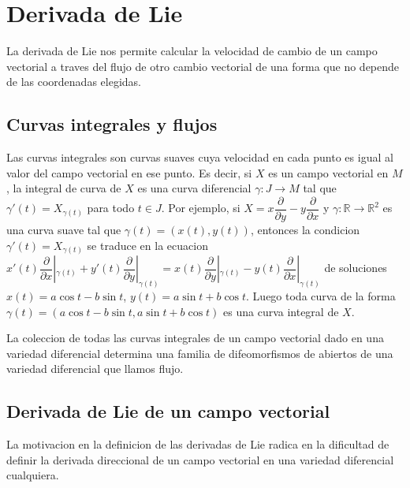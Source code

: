\documentclass[12pt]{extarticle}
\newcommand{\R}{\mathbb{R}}
\newcommand{\<}{\langle}
\renewcommand{\>}{\rangle}
\theoremstyle{definition}
\begin{document}
\section{Derivada de Lie}
La derivada de Lie nos permite calcular la velocidad de cambio de un campo
vectorial a traves del flujo de otro cambio vectorial de una forma que no
depende de las coordenadas elegidas.

\subsection{Curvas integrales y flujos}
Las curvas integrales son curvas suaves cuya velocidad en cada punto es igual al
valor del campo vectorial en ese punto. Es decir, si $X$ es un campo vectorial
en $M$, la integral de curva de $X$ es una curva diferencial $\gamma:J
\rightarrow M$ tal que $\gamma'(t)=X_{\gamma(t)}$ para todo $t\in J$. Por
ejemplo, si $X = x \dfrac{\partial}{\partial y} - y \dfrac{\partial}{\partial
x}$ y $\gamma: \R \rightarrow \R^2$ es una curva suave tal que $\gamma(t) =
(x(t), y(t))$, entonces la condicion $\gamma'(t)=X_{\gamma(t)}$ se traduce en la
ecuacion $x'(t) \dfrac{\partial}{\partial x}|_{\gamma(t)} +
y'(t)\dfrac{\partial}{\partial y}|_{\gamma(t)} = x(t) \dfrac{\partial}{\partial
y}|_{\gamma(t)} - y(t)\dfrac{\partial}{\partial x}|_{\gamma(t)}$ de soluciones $x(t)=a\cos t
- b\sin t$, $y(t)=a\sin t + b\cos t$. Luego toda curva de la
forma $\gamma(t)=(a\cos t - b\sin t, a\sin t + b\cos t)$ es una curva integral de $X$.

La coleccion de todas las curvas
integrales de un campo vectorial dado en una variedad diferencial determina una
familia de difeomorfismos de abiertos de una variedad diferencial que llamos
flujo.

\subsection{Derivada de Lie de un campo vectorial}

La motivacion en la definicion de las derivadas de Lie radica en la
dificultad de definir la derivada direccional de un campo vectorial en una
variedad diferencial cualquiera.
\end{document}
